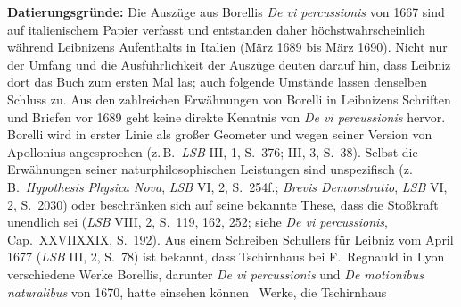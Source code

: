 \begin{ledgroup}
\footnotesize
\pstart
\noindent%
\textbf{Datierungsgründe:}
Die Auszüge aus \protect{}Borellis \cite{01001}\textit{De vi percussionis} von 1667
%
sind auf italienischem Papier verfasst und entstanden daher höchstwahrscheinlich während Leibnizens Aufenthalts in Italien (März 1689 bis März 1690).
%
\pend
%
\pstart
Nicht nur der Umfang und die Ausführlichkeit der Auszüge deuten darauf hin, dass Leibniz dort das Buch zum ersten Mal las; auch folgende Umstände lassen denselben Schluss zu.
%
Aus den zahlreichen Erwähnungen von 
%
\protect{}Borelli  
%
in Leibnizens Schriften und Briefen vor 1689 geht keine direkte Kenntnis von \cite{01001}\textit{De vi percussionis} hervor. 
%
\protect{}Borelli wird in erster Linie als großer Geometer und wegen seiner Version von
%
\protect{}Apollonius
%
angesprochen (z.\,B.\ \textit{LSB} III, 1, S.~376; III, 3, S.~38).
%
Selbst die Erwähnungen seiner naturphilosophischen Leistungen sind unspezifisch (z.\,B.\ \cite{00256}\textit{Hypothesis Physica Nova}, \textit{LSB} VI, 2, S.~254f.; \cite{01099}\textit{Brevis Demonstratio}, \textit{LSB} VI, 2, S.~2030)
%
oder beschränken sich auf seine bekannte These, dass die Stoßkraft unendlich sei (\textit{LSB} VIII, 2, S.~119, 162, 252; siehe \cite{01001}\textit{De vi percussionis}, Cap.~XXVII\textendash XXIX, S.~192).
%
%
Aus einem \cite{02067}Schreiben
%
\protect{}Schullers
%
für Leibniz vom April 1677 (\textit{LSB} III, 2, S.~78) ist bekannt, dass
%
\protect{}Tschirnhaus
%
bei \protect{}F.~Regnauld in Lyon
%
verschiedene Werke \protect{}Borellis, darunter \cite{01001}\textit{De vi percussionis} und \cite{02068}\textit{De motionibus naturalibus} von 1670, hatte einsehen können
%
\textendash\ Werke, die \protect{}Tschirnhaus

\end{ledgroup}
